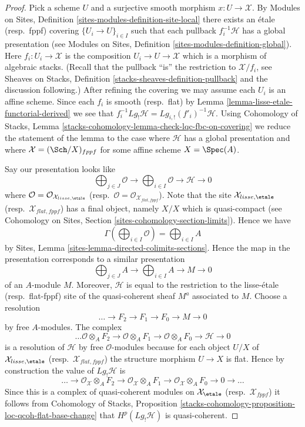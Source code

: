\begin{proof}
Pick a scheme $U$ and a surjective smooth morphism $x : U \to \mathcal{X}$. By
Modules on Sites, Definition \ref{sites-modules-definition-site-local}
there exists an \'etale (resp.\ fppf) covering
$\{U_i \to U\}_{i \in I}$ such that each pullback $f_i^{-1}\mathcal{H}$
has a global presentation (see
Modules on Sites, Definition \ref{sites-modules-definition-global}).
Here $f_i : U_i \to \mathcal{X}$ is the composition
$U_i \to U \to \mathcal{X}$ which is a morphism of algebraic stacks.
(Recall that the pullback ``is'' the restriction to $\mathcal{X}/f_i$, see
Sheaves on Stacks, Definition \ref{stacks-sheaves-definition-pullback}
and the discussion following.)
After refining the covering we may assume each $U_i$ is an affine scheme.
Since each $f_i$ is smooth (resp.\ flat) by
Lemma \ref{lemma-lisse-etale-functorial-derived}
we see that $f_i^{-1}Lg_!\mathcal{H} = Lg_{i, !}(f'_i)^{-1}\mathcal{H}$.
Using
Cohomology of Stacks,
Lemma \ref{stacks-cohomology-lemma-check-lqc-fbc-on-covering}
we reduce the statement of the lemma to the case where $\mathcal{H}$
has a global presentation and where $\mathcal{X} = (\Sch/X)_{fppf}$
for some affine scheme $X = \Spec(A)$.

\medskip\noindent
Say our presentation looks like
$$
\bigoplus\nolimits_{j \in J} \mathcal{O} \longrightarrow
\bigoplus\nolimits_{i \in I} \mathcal{O} \longrightarrow
\mathcal{H} \longrightarrow 0
$$
where $\mathcal{O} = \mathcal{O}_{\mathcal{X}_{lisse,\etale}}$
(resp.\ $\mathcal{O} = \mathcal{O}_{\mathcal{X}_{flat,fppf}}$).
Note that the site $\mathcal{X}_{lisse,\etale}$
(resp.\ $\mathcal{X}_{flat,fppf}$) has a final object, namely
$X/X$ which is quasi-compact (see
Cohomology on Sites, Section \ref{sites-cohomology-section-limits}).
Hence we have
$$
\Gamma(\bigoplus\nolimits_{i \in I} \mathcal{O}) =
\bigoplus\nolimits_{i \in I} A
$$
by Sites, Lemma \ref{sites-lemma-directed-colimits-sections}. Hence the map
in the presentation corresponds to a similar presentation
$$
\bigoplus\nolimits_{j \in J} A \longrightarrow
\bigoplus\nolimits_{i \in I} A \longrightarrow
M \longrightarrow 0
$$
of an $A$-module $M$. Moreover, $\mathcal{H}$ is equal to the restriction
to the lisse-\'etale (resp.\ flat-fppf) site of the quasi-coherent sheaf
$M^a$ associated to $M$. Choose a resolution
$$
\ldots \to F_2 \to F_1 \to F_0 \to M \to 0
$$
by free $A$-modules. The complex
$$
\ldots \mathcal{O} \otimes_A F_2 \to \mathcal{O} \otimes_A F_1 \to
\mathcal{O} \otimes_A F_0 \to \mathcal{H} \to 0
$$
is a resolution of $\mathcal{H}$ by free $\mathcal{O}$-modules because
for each object $U/X$ of $\mathcal{X}_{lisse,\etale}$
(resp.\ $\mathcal{X}_{flat,fppf}$) the structure morphism $U \to X$
is flat. Hence by construction the value of $Lg_!\mathcal{H}$ is
$$
\ldots \to
\mathcal{O}_\mathcal{X} \otimes_A F_2 \to
\mathcal{O}_\mathcal{X} \otimes_A F_1 \to
\mathcal{O}_\mathcal{X} \otimes_A F_0 \to 0 \to \ldots
$$
Since this is a complex of quasi-coherent modules on
$\mathcal{X}_\etale$ (resp.\ $\mathcal{X}_{fppf}$)
it follows from
Cohomology of Stacks,
Proposition \ref{stacks-cohomology-proposition-loc-qcoh-flat-base-change}
that $H^p(Lg_!\mathcal{H})$ is quasi-coherent.
\end{proof}
